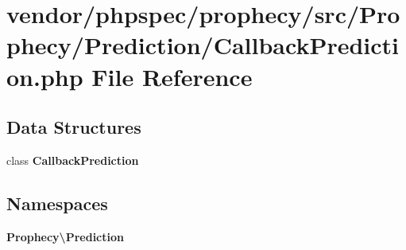 \section{vendor/phpspec/prophecy/src/\+Prophecy/\+Prediction/\+Callback\+Prediction.php File Reference}
\label{_callback_prediction_8php}
\subsection*{Data Structures}
\begin{DoxyCompactItemize}
\item 
class {\bf Callback\+Prediction}
\end{DoxyCompactItemize}
\subsection*{Namespaces}
\begin{DoxyCompactItemize}
\item 
 {\bf Prophecy\textbackslash{}\+Prediction}
\end{DoxyCompactItemize}
